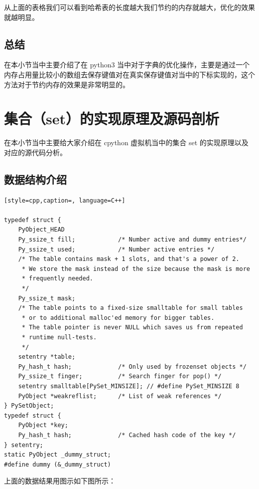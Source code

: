 从上面的表格我们可以看到哈希表的长度越大我们节约的内存就越大，优化的效果就越明显。
\subsection{总结}
在本小节当中主要介绍了在 python3 当中对于字典的优化操作，主要是通过一个内存占用量比较小的数组去保存键值对在真实保存键值对当中的下标实现的，这个方法对于节约内存的效果是非常明显的。

\section{集合（set）的实现原理及源码剖析}
在本小节当中主要给大家介绍在 cpython 虚拟机当中的集合 set 的实现原理以及对应的源代码分析。
\subsection{数据结构介绍}
\begin{lstlisting}[style=cpp,caption=, language=C++]

typedef struct {
    PyObject_HEAD
    Py_ssize_t fill;            /* Number active and dummy entries*/
    Py_ssize_t used;            /* Number active entries */
    /* The table contains mask + 1 slots, and that's a power of 2.
     * We store the mask instead of the size because the mask is more
     * frequently needed.
     */
    Py_ssize_t mask;
    /* The table points to a fixed-size smalltable for small tables
     * or to additional malloc'ed memory for bigger tables.
     * The table pointer is never NULL which saves us from repeated
     * runtime null-tests.
     */
    setentry *table;
    Py_hash_t hash;             /* Only used by frozenset objects */
    Py_ssize_t finger;          /* Search finger for pop() */
    setentry smalltable[PySet_MINSIZE]; // #define PySet_MINSIZE 8
    PyObject *weakreflist;      /* List of weak references */
} PySetObject;
typedef struct {
    PyObject *key;
    Py_hash_t hash;             /* Cached hash code of the key */
} setentry;
static PyObject _dummy_struct;
#define dummy (&_dummy_struct)
\end{lstlisting}
上面的数据结果用图示如下图所示：

